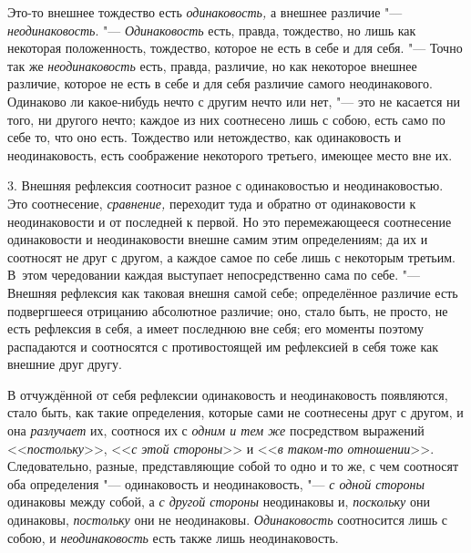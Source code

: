 Это-то внешнее тождество есть {\em одинаковость,} а
внешнее различие "--- {\em неодинаковость}. "---
{\em Одинаковость} есть, правда, тождество, но лишь как
некоторая положенность, тождество, которое не есть в себе и для себя. "---
Точно так же {\em неодинаковость} есть, правда,
различие, но как некоторое внешнее различие, которое не есть в себе и для
себя различие самого неодинакового. Одинаково ли какое-нибудь нечто с
другим нечто или нет, "--- это не касается ни того, ни другого нечто; каждое
из них соотнесено лишь с собою, есть само по себе то, что оно есть.
Тождество или нетождество, как одинаковость и неодинаковость, есть
соображение некоторого третьего, имеющее место вне их.

3. Внешняя рефлексия соотносит разное с одинаковостью и неодинаковостью. Это
соотнесение, {\em сравнение,} переходит туда и обратно
от одинаковости к неодинаковости и от последней к первой. Но это
перемежающееся соотнесение одинаковости и неодинаковости внешне самим этим
определениям; да их и соотносят не друг с другом, а каждое самое по себе
лишь с некоторым третьим. В~этом чередовании каждая выступает
непосредственно сама по себе. "--- Внешняя рефлексия как таковая внешня самой
себе; определённое различие есть подвергшееся отрицанию абсолютное
различие; оно, стало быть, не просто, не есть рефлексия в себя, а имеет
последнюю вне себя; его моменты поэтому распадаются и соотносятся с
противостоящей им рефлексией в себя тоже как внешние друг другу.

В отчуждённой от себя рефлексии одинаковость и неодинаковость появляются,
стало быть, как такие определения, которые сами не соотнесены друг с
другом, и она {\em разлучает} их, соотнося их с
{\em одним и тем же} посредством выражений <<{\em постольку}>>,
<<{\em с этой стороны}>> и <<{\em в таком-то отношении}>>.
Следовательно, разные, представляющие собой то одно и то же, с чем
соотносят оба определения "--- одинаковость и неодинаковость, "---
{\em с одной стороны} одинаковы между собой, а
{\em с другой стороны} неодинаковы и,
{\em поскольку} они одинаковы, {\em постольку} они не неодинаковы.
{\em Одинаковость} соотносится лишь с собою, и
{\em неодинаковость} есть также лишь неодинаковость.

